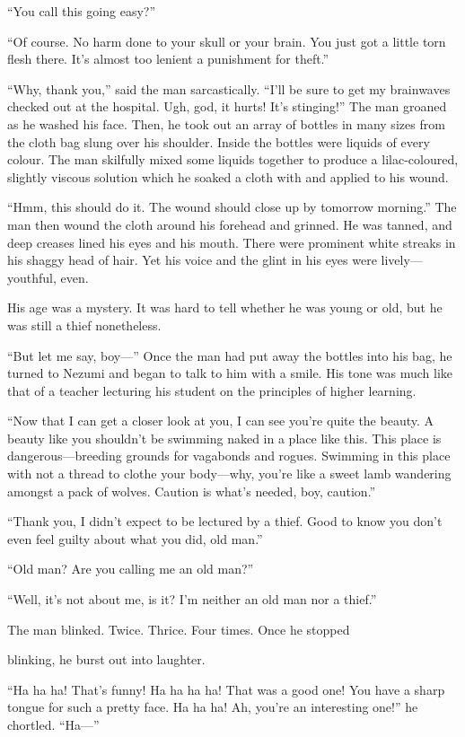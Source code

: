 ``You call this going easy?''

``Of course. No harm done to your skull or your brain. You just got a
little torn flesh there. It's almost too lenient a punishment for
theft.''

``Why, thank you,'' said the man sarcastically. ``I'll be sure to get my
brainwaves checked out at the hospital. Ugh, god, it hurts! It's
stinging!'' The man groaned as he washed his face. Then, he took out an
array of bottles in many sizes from the cloth bag slung over his
shoulder. Inside the bottles were liquids of every colour. The man
skilfully mixed some liquids together to produce a lilac-coloured,
slightly viscous solution which he soaked a cloth with and applied to
his wound.

``Hmm, this should do it. The wound should close up by tomorrow
morning.'' The man then wound the cloth around his forehead and grinned.
He was tanned, and deep creases lined his eyes and his mouth. There were
prominent white streaks in his shaggy head of hair. Yet his voice and
the glint in his eyes were lively---youthful, even.

His age was a mystery. It was hard to tell whether he was young or old,
but he was still a thief nonetheless.

``But let me say, boy---'' Once the man had put away the bottles into his
bag, he turned to Nezumi and began to talk to him with a smile. His tone
was much like that of a teacher lecturing his student on the principles
of higher learning.

``Now that I can get a closer look at you, I can see you're quite the
beauty. A beauty like you shouldn't be swimming naked in a place like
this. This place is dangerous---breeding grounds for vagabonds and rogues.
Swimming in this place with not a thread to clothe your body---why, you're
like a sweet lamb wandering amongst a pack of wolves. Caution is what's
needed, boy, caution.''

``Thank you, I didn't expect to be lectured by a thief. Good to know you
don't even feel guilty about what you did, old man.''

``Old man? Are you calling me an old man?''

``Well, it's not about me, is it? I'm neither an old man nor a thief.''

The man blinked. Twice. Thrice. Four times. Once he stopped~

blinking, he burst out into laughter.

``Ha ha ha! That's funny! Ha ha ha ha! That was a good one! You have a
sharp tongue for such a pretty face. Ha ha ha! Ah, you're an interesting
one!'' he chortled. ``Ha---''

